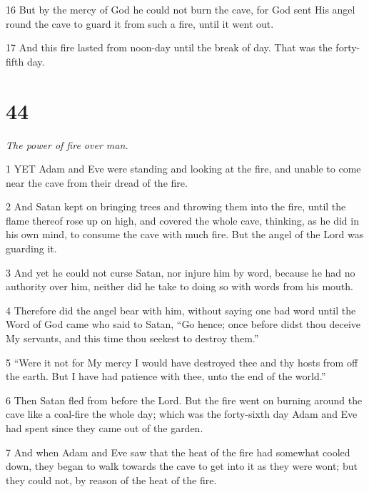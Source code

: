 \par 16 But by the mercy of God he could not burn the cave, for God sent His angel round the cave to guard it from such a fire, until it went out.

\par 17 And this fire lasted from noon-day until the break of day. That was the forty-fifth day.

\chapter{44}

\par \textit{The power of fire over man.}

\par 1 YET Adam and Eve were standing and looking at the fire, and unable to come near the cave from their dread of the fire.

\par 2 And Satan kept on bringing trees and throwing them into the fire, until the flame thereof rose up on high, and covered the whole cave, thinking, as he did in his own mind, to consume the cave with much fire. But the angel of the Lord was guarding it.

\par 3 And yet he could not curse Satan, nor injure him by word, because he had no authority over him, neither did he take to doing so with words from his mouth.

\par 4 Therefore did the angel bear with him, without saying one bad word until the Word of God came who said to Satan, “Go hence; once before didst thou deceive My servants, and this time thou seekest to destroy them.”

\par 5 “Were it not for My mercy I would have destroyed thee and thy hosts from off the earth. But I have had patience with thee, unto the end of the world.”

\par 6 Then Satan fled from before the Lord. But the fire went on burning around the cave like a coal-fire the whole day; which was the forty-sixth day Adam and Eve had spent since they came out of the garden.

\par 7 And when Adam and Eve saw that the heat of the fire had somewhat cooled down, they began to walk towards the cave to get into it as they were wont; but they could not, by reason of the heat of the fire.

